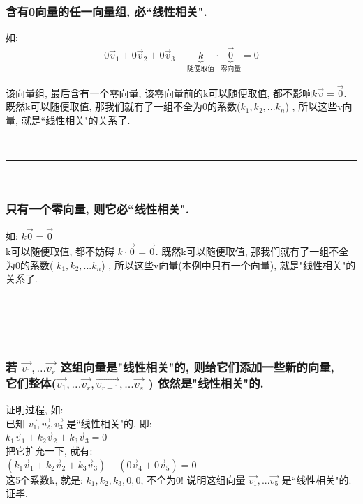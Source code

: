 \documentclass[UTF8]{ctexart}
\begin{document}
\subsubsection{含有0向量的任一向量组, 必``线性相关".}

如:
\begin{align*}
	0\vec{v}_1+0\vec{v}_2+0\vec{v}_3+\underset{\text{随便取值}}{\underbrace{k}}\cdot \underset{\text{零向量}}{\underbrace{\vec{0}}}=0
\end{align*}

该向量组, 最后含有一个零向量, 该零向量前的k可以随便取值, 都不影响$k\vec{v}=\vec{0}$. 既然k可以随便取值, 那我们就有了一组不全为0的系数($k_1, k_2, ...k_n$) , 所以这些v向量, 就是``线性相关"的关系了. 

~\\
\hrule
~\\

\subsubsection{只有一个零向量, 则它必``线性相关".}

如:  $k\vec{0}=\vec{0}$ \\
k可以随便取值, 都不妨碍  $ k \cdot \vec{0}= \vec{0}$. 既然k可以随便取值, 那我们就有了一组不全为0的系数( $ k_1, k_2, ...k_n$) , 所以这些v向量(本例中只有一个向量), 就是"线性相关"的关系了.

~\\
\hrule
~\\

\subsubsection{若 $\vec{v_1}, ... \vec{v_r}$ 这组向量是"线性相关"的, 则给它们添加一些新的向量, \\它们整体($\vec{v_1}, ... \vec{v_r}, \vec{v_{r+1}}, ... \vec{v_s}$ ) 依然是"线性相关"的.}

证明过程, 如: \\
已知 $\vec{v_1}, \vec{v_2}, \vec{v_3}$ 是``线性相关"的, 即: \\
$k_1\vec{v}_1+k_2\vec{v}_2+k_3\vec{v}_3=0 $\\

把它扩充一下, 就有:\\
$(k_1\vec{v}_1+k_2\vec{v}_2+k_3\vec{v}_3) +(0\vec{v}_4+0\vec{v}_5)=0$\\

这5个系数k, 就是: $k_1, k_2, k_3, 0, 0$, 不全为0! 说明这组向量 $\vec{v_1}, ... \vec{v_5}$ 是``线性相关"的. 证毕.\\
\end{document}
